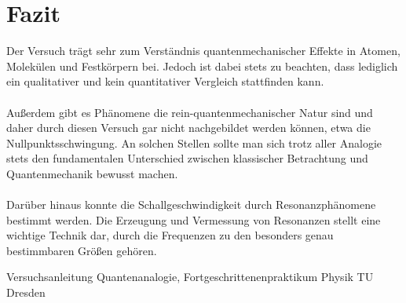 \documentclass[german,  %
parskip=full,  %
]{scrartcl}
\begin{document}
\section{Fazit}
Der Versuch trägt sehr zum Verständnis quantenmechanischer Effekte in Atomen, Molekülen und Festkörpern bei. Jedoch ist dabei stets zu beachten, dass lediglich ein qualitativer und kein quantitativer Vergleich stattfinden kann. \\\\
Außerdem gibt es Phänomene die rein-quantenmechanischer Natur sind und daher durch diesen Versuch gar nicht nachgebildet werden können, etwa die Nullpunktsschwingung. An solchen Stellen sollte man sich trotz aller Analogie stets den fundamentalen Unterschied zwischen klassischer Betrachtung und Quantenmechanik bewusst machen. \\\\
Darüber hinaus konnte die Schallgeschwindigkeit durch Resonanzphänomene bestimmt werden. Die Erzeugung und Vermessung von Resonanzen stellt eine wichtige Technik dar, durch die Frequenzen zu den besonders genau bestimmbaren Größen gehören.


    \begin{thebibliography}{9}
    Versuchsanleitung Quantenanalogie, Fortgeschrittenenpraktikum Physik TU Dresden
    \end{thebibliography}
\end{document}
